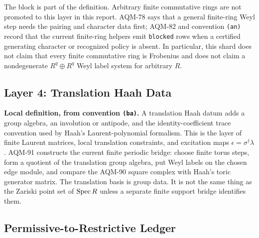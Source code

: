 The block is part of the definition.  Arbitrary finite commutative rings are
not promoted to this layer in this report.  AQM-78 says that a general
finite-ring Weyl step needs the pairing and character data first; AQM-82 and
convention \texttt{(an)} record that the current finite-ring helpers emit
\texttt{blocked} rows when a certified generating character or recognized
policy is absent.  In particular, this shard does not claim that every finite
commutative ring is Frobenius and does not claim a nondegenerate
\(R^q\oplus R^q\) Weyl label system for arbitrary \(R\).

\subsection{Layer 4: Translation Haah Data}

\textbf{Local definition, from convention \texttt{(ba)}.}  A translation
Haah datum adds a group algebra, an involution or antipode, and the
identity-coefficient trace convention used by Haah's Laurent-polynomial
formalism.  This is the layer of finite Laurent matrices, local translation
constraints, and excitation maps \(\epsilon=\sigma^\dagger\lambda\).
AQM-91 constructs the current finite periodic bridge: choose finite torus
steps, form a quotient of the translation group algebra, put Weyl labels on
the chosen edge module, and compare the AQM-90 square complex with Haah's
toric generator matrix.  The translation basis is group data.  It is not the
same thing as the Zariski point set of \(\operatorname{Spec} R\) unless a separate finite
support bridge identifies them.

\subsection{Permissive-to-Restrictive Ledger}

